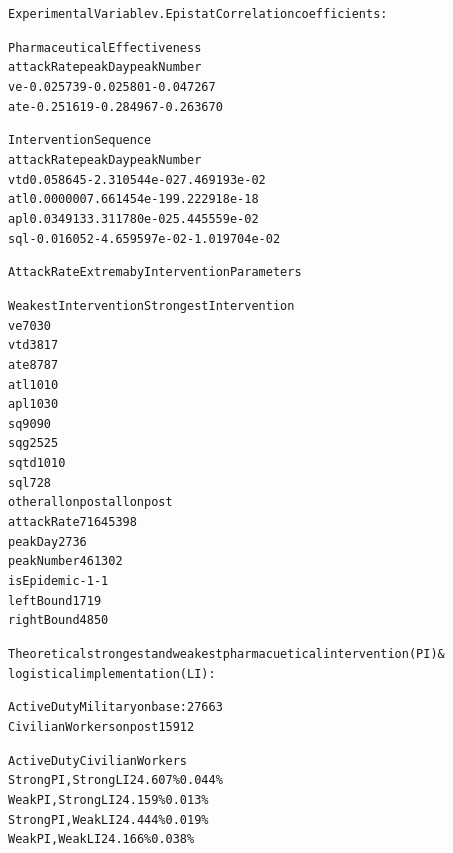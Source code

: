 \documentclass[letterpaper,10pt,english]{/Library/Python/2.7/site-packages/sphinx/texinputs/sphinxhowto}
\newenvironment{InvisibleVerbatim}
        {\begin{mdframed}[leftmargin=0.1\linewidth,innerleftmargin=3pt,innerrightmargin=3pt, userdefinedwidth=1\linewidth, linewidth=0pt, linecolor=white, usetwoside=false]}
        {\end{mdframed}}
\begin{document}
                \begin{InvisibleVerbatim}
                \vspace{-0.5\baselineskip}
\begin{alltt}Experimental Variable v. Epistat Correlation coefficients:

Pharmaceutical Effectiveness
     attackRate   peakDay  peakNumber
ve    -0.025739 -0.025801   -0.047267
ate   -0.251619 -0.284967   -0.263670

Intervention Sequence
     attackRate       peakDay    peakNumber
vtd    0.058645 -2.310544e-02  7.469193e-02
atl    0.000000  7.661454e-19  9.222918e-18
apl    0.034913  3.311780e-02  5.445559e-02
sql   -0.016052 -4.659597e-02 -1.019704e-02


Attack Rate Extrema by Intervention Parameters

           Weakest Intervention Strongest Intervention
ve                           70                     30
vtd                          38                     17
ate                          87                     87
atl                          10                     10
apl                          10                     30
sq                           90                     90
sqg                          25                     25
sqtd                         10                     10
sql                           7                     28
other                 allonpost              allonpost
attackRate                 7164                   5398
peakDay                      27                     36
peakNumber                  461                    302
isEpidemic                   -1                     -1
leftBound                    17                     19
rightBound                   48                     50


Theoretical strongest and weakest pharmacuetical intervention (PI) \&
logistical implementation (LI):

Active Duty Military on base: 27663
Civilian Workers on post 15912

                Active Duty     Civilian Workers
Strong PI, Strong LI    24.607\%         0.044\%
Weak PI, Strong LI      24.159\%         0.013\%
Strong PI, Weak LI      24.444\%         0.019\%
Weak PI, Weak LI        24.166\%         0.038\%



\end{alltt}

            \end{InvisibleVerbatim}
            
\end{document}
